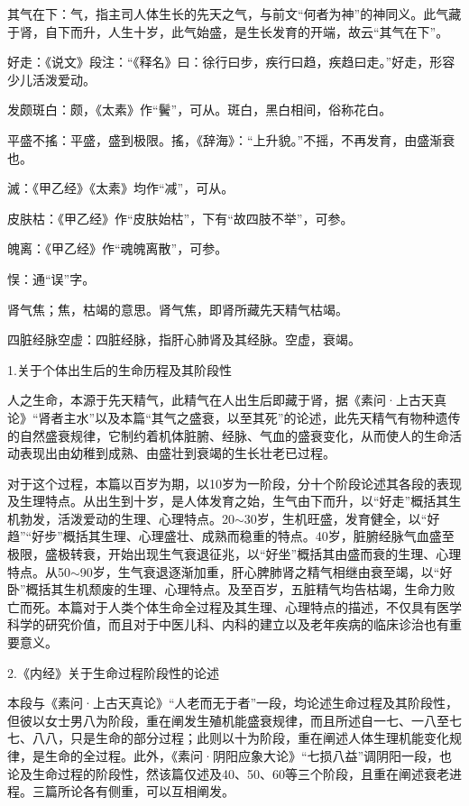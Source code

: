 \documentclass[draft,12pt]{ctexbook}
\begin{document}
\begin{jiaozhu}
  \item 其气在下：气，指主司人体生长的先天之气，与前文“何者为神”的神同义。此气藏于肾，自下而升，人生十岁，此气始盛，是生长发育的开端，故云“其气在下”。
  \item 好走：《说文》段注：“《释名》曰：徐行曰步，疾行曰趋，疾趋曰走。”好走，形容少儿活泼爱动。
  \item 发颇斑白：颇，《太素》作“鬢”，可从。斑白，黑白相间，俗称花白。
  \item 平盛不搖：平盛，盛到极限。搖，《辞海》：“上升貌。”不摇，不再发育，由盛渐衰也。
  \item 滅：《甲乙经》《太素》均作“减”，可从。
  \item 皮肤枯：《甲乙经》作“皮肤始枯”，下有“故四肢不举”，可参。
  \item 魄离：《甲乙经》作“魂魄离散”，可参。
  \item 悮：通“误”字。
  \item 肾气焦；焦，枯竭的意思。肾气焦，即肾所藏先天精气枯竭。
  \item 四脏经脉空虚：四脏经脉，指肝心肺肾及其经脉。空虚，衰竭。
\end{jiaozhu}


1.关于个体出生后的生命历程及其阶段性

人之生命，本源于先天精气，此精气在人出生后即藏于肾，据《素问·上古天真论》“肾者主水”以及本篇“其气之盛衰，以至其死”的论述，此先天精气有物种遗传的自然盛衰规律，它制约着机体脏腑、经脉、气血的盛衰变化，从而使人的生命活动表现出由幼稚到成熟、由盛壮到衰竭的生长壮老已过程。

对于这个过程，本篇以百岁为期，以10岁为一阶段，分十个阶段论述其各段的表现及生理特点。从出生到十岁，是人体发育之始，生气由下而升，以“好走”概括其生机勃发，活泼爱动的生理、心理特点。20$\sim$30岁，生机旺盛，发育健全，以“好趋”“好步”概括其生理、心理盛壮、成熟而稳重的特点。40岁，脏腑经脉气血盛至极限，盛极转衰，开始出现生气衰退征兆，以“好坐”概括其由盛而衰的生理、心理特点。从50$\sim$90岁，生气衰退逐渐加重，肝心脾肺肾之精气相继由衰至竭，以“好卧”概括其生机颓废的生理、心理特点。及至百岁，五脏精气均告枯竭，生命力败亡而死。本篇对于人类个体生命全过程及其生理、心理特点的描述，不仅具有医学科学的研究价值，而且对于中医儿科、内科的建立以及老年疾病的临床诊治也有重要意义。

2.《内经》关于生命过程阶段性的论述

本段与《素问·上古天真论》“人老而无于者”一段，均论述生命过程及其阶段性，但彼以女士男八为阶段，重在阐发生殖机能盛衰规律，而且所述自一七、一八至七七、八八，只是生命的部分过程；此则以十为阶段，重在阐述人体生理机能变化规律，是生命的全过程。此外，《素问·阴阳应象大论》“七损八益”调阴阳一段，也论及生命过程的阶段性，然该篇仅述及40、50、60等三个阶段，且重在阐述衰老进程。三篇所论各有侧重，可以互相阐发。
\end{document}
